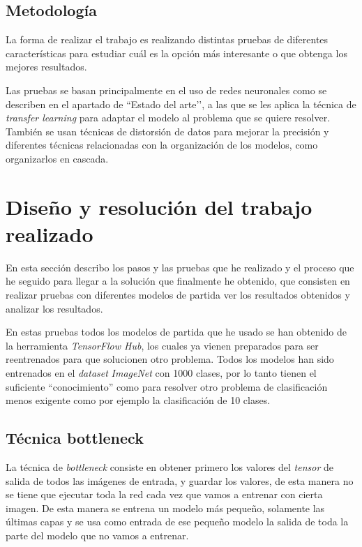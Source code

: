 \documentclass[12pt,a4paper]{article}
\begin{document}
\subsection{Metodología}
La forma de realizar el trabajo es realizando distintas pruebas de diferentes características para estudiar cuál es la opción más interesante o que obtenga los mejores resultados.
\bigskip

Las pruebas se basan principalmente en el uso de redes neuronales como se describen en el apartado de ``Estado del arte’’, a las que se les aplica la técnica de \textit{transfer learning} para adaptar el modelo al problema que se quiere resolver. También se usan técnicas de distorsión de datos para mejorar la precisión y diferentes técnicas relacionadas con la organización de los modelos, como organizarlos en cascada.

\newpage
\section{Diseño y resolución del trabajo realizado}
En esta sección describo los pasos y las pruebas que he realizado y el proceso que he seguido para llegar a la solución que finalmente he obtenido, que consisten en realizar pruebas con diferentes modelos de partida ver los resultados obtenidos y analizar los resultados.
\bigskip

En estas pruebas todos los modelos de partida que he usado se han obtenido de la herramienta \textit{TensorFlow Hub}, los cuales ya vienen preparados para ser reentrenados para que solucionen otro problema. Todos los modelos han sido entrenados en el \textit{dataset} \textit{ImageNet} con 1000 clases, por lo tanto tienen el suficiente ``conocimiento'' como para resolver otro problema de clasificación menos exigente como por ejemplo la clasificación de 10 clases.

\subsection{Técnica bottleneck}
La técnica de \textit{bottleneck} consiste en obtener primero los valores del \textit{tensor} de salida de todos las imágenes de entrada, y guardar los valores, de esta manera no se tiene que ejecutar toda la red cada vez que vamos a entrenar con cierta imagen. De esta manera se entrena un modelo más pequeño, solamente las últimas capas y se usa como entrada de ese pequeño modelo la salida de toda la parte del modelo que no vamos a entrenar.
\bigskip
\end{document}
